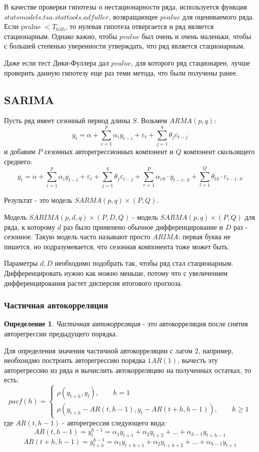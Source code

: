 \documentclass[aps,%
12pt,%
final,%
oneside,
onecolumn,%
musixtex, %
superscriptaddress,%
centertags]{article} %
\theoremstyle{plain}
\theoremstyle{definition}
\newtheorem{definition}{Определение}[subsection]
\theoremstyle{remark}
\begin{document}
В качестве проверки гипотезы о нестационарности ряда, используется функция $statsmodels.tsa.stattools.adfuller$, возвращающее $pvalue$ для оцениваемого ряда. Если pvalue $ < T_{0.05}$, то нулевая гипотеза отвергается и ряд является стационарным. Однако важно, чтобы $pvalue$ был очень и очень маленьки, чтобы с большей степенью уверенности утверждать, что ряд является стационарным. 

Даже если тест Дики-Фуллера дал $pvalue$, для которого ряд стационарен, лучше проверить данную гипотезу еще раз теми метода, что были получены ранее.

\newpage
\subsection{SARIMA}

Пусть ряд имеет сезонный период длины $S$. Возьмем $ARMA(p,q)$:
$$y_t = \alpha + \sum\limits_{i=1}^p \alpha_i y_{t-i} + \varepsilon_t  + \sum\limits_{j=1}^q \theta_j \varepsilon_{t-j}$$
и добавим $P$ сезонных авторегрессионных компонент и $Q$ компонент скользящего среднего:
$$y_t = \alpha + \sum\limits_{i=1}^p \alpha_i y_{t-i} + \varepsilon_t  + \sum\limits_{j=1}^q \theta_j \varepsilon_{t-j} + \sum\limits_{r=1}^P \alpha_{rS} \cdot y_{t-r \cdot S} + \sum\limits_{l=1}^Q \theta_{lS} \cdot \varepsilon_{t-l \cdot S}$$

Результат - это модель $SARMA(p,q) \times (P,Q)$.

Модель $SARIMA(p,d,q) \times (P,D,Q)$ - модель $SARMA(p,q) \times (P,Q)$ для ряда, к которому $d$ раз было применено обычное дифференцирование и $D$ раз - сезонное. Такую модель часто называют просто $ARIMA$: первая буква не пишется, но подразумевается, что сезонная компонента тоже может быть.

Параметры $d,D$ необходимо подобрать так, чтобы ряд стал стационарным. Дифференцировать нужно как можно меньше, потому что с увеличением дифференцирования растет дисперсия итогового прогноза.

\subsubsection{Частичная автокорреляция}

\begin{definition}
	\textit{Частичная автокорреляция} - это автокорреляция после снятия авторегрессии предыдущего порядка.  
\end{definition}

Для определения значения частичной автокорреляции с лагом $2$, например, необхоидмо построить авторегрессию порядка $1$$AR(1)$, вычесть эту авторегрессию из ряда и вычислить автокорреляцию на полученных остатках, то есть:
$$pacf(h) = \begin{cases}
	\rho(y_{t+h}, y_t), \qquad h=1 \\
	\rho(y_{t+h} - AR(t, h-1), y_t - AR(t+h, h-1)), \qquad h \geq 1
\end{cases}$$
где $AR(t,h-1)$ - авторегрессия следующего вида:
$$AR(t,h-1) = y_t^{h-1} = \alpha_1y_{t+1} + \alpha_2y_{t+2} + \ldots + \alpha_{h-1}y_{t+h-1}$$
$$AR(t+h,h-1) = y_{t+h}^{h-1} = \alpha_1y_{t+h+1} + \alpha_2y_{t+h+2} + \ldots + \alpha_{h-1}y_{t+1}$$
\end{document}
